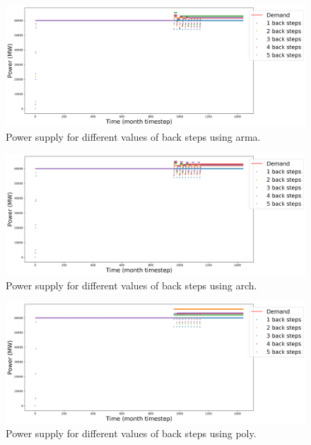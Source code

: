 \documentclass[11pt]{article}
\begin{document}
\begin{figure}[H]
	\centering
	\includegraphics[width=\textwidth]{23-figures/23-power-buffer0-arma-back.png} 
	\hfill
	\caption{Power supply for different values of back steps using arma.}
	\label{fig:23-back-arma}
\end{figure}

\begin{figure}[H]
	\centering
	\includegraphics[width=\textwidth]{23-figures/23-power-buffer0-arch-back.png} 
	\hfill
	\caption{Power supply for different values of back steps using arch.}
	\label{fig:23-back-arch}
\end{figure}

\begin{figure}[H]
	\centering
	\includegraphics[width=\textwidth]{23-figures/23-power-buffer0-poly-back.png} 
	\hfill
	\caption{Power supply for different values of back steps using poly.}
	\label{fig:23-back-poly}
\end{figure}
\end{document}

